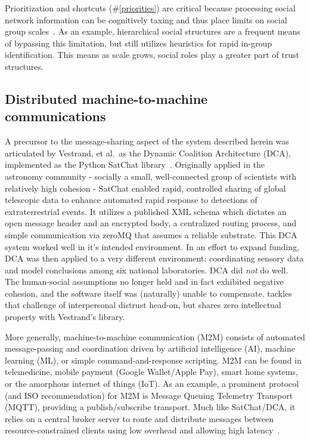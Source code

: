 Prioritization and shortcuts (\#\ref{priorities}) are critical because processing social network information can be cognitively taxing and thus place limits on social group scales~\cite{davidbarrett2013processing}.
As an example, hierarchical social structures are a frequent means of bypassing this limitation, but still utilizes heuristics for rapid in-group identification.
This means as scale grows, social roles play a greater part of trust structures.


\subsection{Distributed machine-to-machine communications}\label{subsec:m2m}

A precursor to the message-sharing aspect of the system described herein was articulated by Vestrand, et al.\ as the Dynamic Coalition Architecture (DCA), implemented as the Python SatChat library~\cite{vestrand2021artificial}.
Originally applied in the astronomy community - socially a small, well-connected group of scientists with relatively high cohesion - SatChat enabled rapid, controlled sharing of global telescopic data to enhance automated rapid response to detections of extraterrestrial events.
It utilizes a published XML schema which dictates an open message header and an encrypted body, a centralized routing process, and simple communication via zeroMQ that assumes a reliable substrate.
This DCA system worked well in it's intended environment.
In an effort to expand funding, DCA was then applied to a very different environment: coordinating sensory data and model conclusions among six national laboratories.
DCA did \textit{not} do well.
The human-social assumptions no longer held and in fact exhibited negative cohesion, and the software itself was (naturally) unable to compensate. \projectName tackles that challenge of interpersonal distrust head-on, but shares zero intellectual property with Vestrand's library.

More generally, machine-to-machine communication (M2M) consists of automated message-passing and coordination driven by artificial intelligence (AI), machine learning (ML), or simple command-and-response scripting.
M2M can be found in telemedicine, mobile payment (Google Wallet/Apple Pay), smart home systems, or the amorphous internet of things (IoT). As an example, a prominent protocol (and ISO recommendation) for M2M is Message Queuing Telemetry Transport (MQTT), providing a publish/subscribe transport.
Much like SatChat/DCA, it relies on a central broker server to route and distribute messages between resource-constrained clients using low overhead and allowing high latency~\cite{oasis2019mqtt}.


